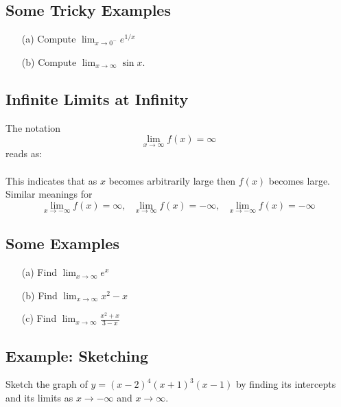 \documentclass[10pt]{book}
\theoremstyle{definition}
\begin{document}
\subsection*{Some Tricky Examples}
\begin{itemize}
    \item[(a)] Compute $\displaystyle \lim_{x\rightarrow 0^-}e^{1/x}$\vspace{4cm}
    \item[(b)] Compute $\displaystyle\lim_{x\rightarrow \infty}\sin x$.
\end{itemize}
\raggedbottom
\clearpage
\begin{tcolorbox}
\subsection*{Infinite Limits at Infinity}
The notation
\[
\lim_{x\rightarrow \infty}f(x)=\infty
\]
reads as: \\ \\
This indicates that as $x$ becomes arbitrarily large then $f(x)$ becomes large. Similar meanings for
\[
\lim_{x\rightarrow -\infty}f(x)=\infty,\ \ \ \lim_{x\rightarrow \infty}f(x)=-\infty,\ \ \ \lim_{x\rightarrow -\infty}f(x)=-\infty
\]
\end{tcolorbox}
\subsection*{Some Examples}
\begin{itemize}
    \item[(a)] Find $\displaystyle\lim_{x\rightarrow \infty}e^x$\vspace{4cm}
    \item[(b)]Find $\displaystyle\lim_{x\rightarrow \infty}x^2-x$\vspace{4cm}
    \item[(c)]Find
    $\displaystyle\lim_{x\rightarrow \infty}\frac{x^2+x}{3-x}$
\end{itemize}
\raggedbottom
\clearpage
\subsection*{Example: Sketching}
Sketch the graph of $y=(x-2)^4(x+1)^3(x-1)$ by finding its intercepts and its limits as $x\rightarrow -\infty$ and $x\rightarrow \infty$.
\end{document}
